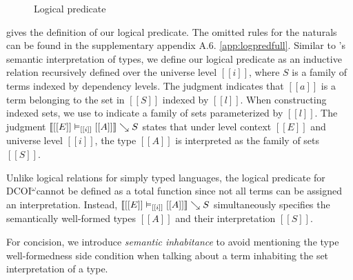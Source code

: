 \documentclass[acmsmall, screen=true, nonacm=true,
  review=\ifpublic false\else true\fi,
  anonymous=\ifanonymous true\else false\fi
]{acmart}
\makeatletter
\DeclarePairedDelimiter{\bracks}{\llbracket}{\rrbracket}
\DeclarePairedDelimiter{\braces}{\lbrace}{\rbrace}
\newcommand{\name}{\texorpdfstring{DCOI$^{\omega}$\@\xspace}{DCOI-omega}}
\newcommand{\judgement}[1]{{\setlength{\fboxsep}{1.5pt}\fbox{#1}}}
\newcommand{\interp}[4]{\bracks{#1 \vDash_{#2} #3} \searrow #4}
\newcommand{\interpU}[3]{\bracks{#1 \vDash_{#2} #3}}
\newcommand{\buildset}[3]{#2 . \braces{#1 \mid #3}}
\newcommand{\member}[3]{#1 \in #3(#2)}
\newcommand{\sigspace}[5]{#1 \in \hat{\Sigma}(#2^{#3}, #4^{#5})}
\makeatother
\begin{document}
\begin{figure}[h]
  \caption{Logical predicate}
  \Description{}
  \label{fig:logpred}
\end{figure}

 gives the definition of our logical
predicate. The omitted rules for the naturals can be
found in
\ifsubmission the supplementary appendix A.6.
\else \cref{app:logpredfull}.
\fi
Similar to \citet{abel:irrelevance}'s semantic interpretation of types,
we define our logical predicate \judgement{$\interp{[[E]]}{[[i]]}{[[A]]}{S}$}
as an inductive relation recursively defined over the universe level $[[i]]$,
where $S$ is a family of terms indexed by dependency levels.
The judgment \judgement{$\member{a}{[[l]]}{S}$} indicates that $[[a]]$ is
a term belonging to the set in $[[S]]$ indexed by $[[l]]$.
When constructing indexed sets, we use
\judgement{$\buildset{[[a]]}{[[l]]}{\ldots}$} to indicate a family of sets
parameterized by $[[l]]$.
The judgment $\interp{[[E]]}{[[i]]}{[[A]]}{S}$ states that under
level context $[[E]]$ and universe level $[[i]]$, the type $[[A]]$
is interpreted as the family of sets $[[S]]$.

\ifextended
Unlike logical relations for simply typed languages, the logical
predicate for \name cannot be defined as a total function since not
all terms can be assigned an interpretation. Instead,
\mbox{$\interp{[[E]]}{[[i]]}{[[A]]}{S}$} simultaneously specifies the
semantically well-formed types $[[A]]$ and their interpretation $[[S]]$.
\fi

For concision, we introduce \emph{semantic inhabitance} to
avoid mentioning the type well-formedness side condition
when talking about a term inhabiting the set interpretation of a type.
\end{document}
